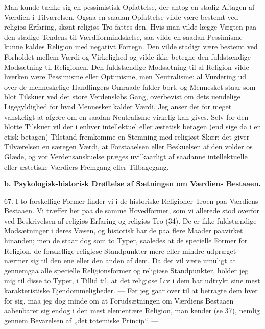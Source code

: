\documentclass[12pt,a4paper,openany]{book}
\newcommand{\opage}[1]{\marginnote{\footnotesize\textit{[#1]}}}
\begin{document}
Man kunde tænke sig en pessimistisk Opfattelse, der antog en stadig
Aftagen af Værdien i Tilværelsen. Ogsaa en saadan Opfattelse vilde være
bestemt ved religiøs Erfaring, skønt religiøs Tro fattes den. Hvis man
vilde lægge Vægten paa den stadige Tendens til Værdiformindskelse, saa
vilde en saadan Pessimisme kunne kaldes Religion med negativt Fortegn.
Den vilde stadigt være bestemt ved Forholdet mellem Værdi og Virkelighed
og vilde ikke betegne den fuldstændige Modsætning til Religionen. Den
fuldstændige Modsætning til al Religion vilde hverken være Pessimisme
eller Optimisme, men Neutralisme: al Vurdering ud over de menneskelige
Handlingers Omraade falder bort, og Mennesket staar som blot Tilskuer
ved det store Verdensløbs Gang, overbevist om dets uendelige
Ligegyldighed for hvad Mennesker kalder Værdi. Jeg anser det for meget
vanskeligt at afgøre om en saadan Neutralisme virkelig kan gives. Selv
for den blotte Tilskuer vil der i enhver intellektuel eller æstetisk
betagen (end sige da i en etisk betagen) Tilstand fremkomme en Stemning
\opage{154}med religiøst Skær: det giver Tilværelsen en særegen Værdi,
at Forstaaelsen eller Beskuelsen af den volder os Glæde, og vor
Verdensanskuelse præges uvilkaarligt af saadanne intellektuelle eller
æstetiske Værdiers Fremgang eller Tilbagegang.

\begin{center}\textbf{b. Psykologisk-historisk Drøftelse af Sætningen om Værdiens Bestaaen.}\end{center}

67. I to forskellige Former finder vi i de historiske Religioner Troen
paa Værdiens Bestaaen. Vi træffer her paa de samme Hovedformer, som vi
allerede stod overfor ved Beskrivelsen af religiøs Erfaring og religiøs
Tro (34). De er ikke fuldstændige Modsætninger i deres Væsen, og
historisk har de paa flere Maader paavirket hinanden; men de staar dog
som to Typer, saaledes at de specielle Former for Religion, de
forskellige religiøse Standpunkter mere eller mindre udpræget nærmer sig
til den ene eller den anden af dem. Da det vil være umuligt at gennemgaa
alle specielle Religionsformer og religiøse Standpunkter, holder jeg mig
til disse to Typer, i Tillid til, at det religiøse Liv i dem har udtrykt
sine mest karakteristiske Ejendommeligheder. --- Før jeg gaar over til
at betragte dem hver for sig, maa jeg dog minde om at Forudsætningen om
Værdiens Bestaaen aabenbarer sig endog i den mest elementære Religion,
man kender (se 37), nemlig gennem Bevarelsen af „det totemiske Princip“.
---
\end{document}
